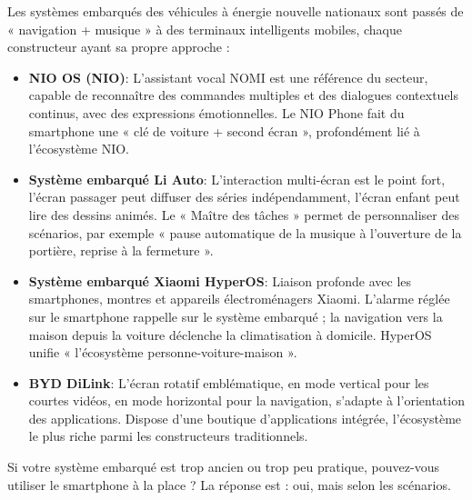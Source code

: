 
Les systèmes embarqués des véhicules à énergie nouvelle nationaux sont passés de « navigation + musique » à des terminaux intelligents mobiles, chaque constructeur ayant sa propre approche :

\begin{itemize}
  \item \textbf{NIO OS (NIO)}: L'assistant vocal NOMI est une référence du secteur, capable de reconnaître des commandes multiples et des dialogues contextuels continus, avec des expressions émotionnelles. Le NIO Phone fait du smartphone une « clé de voiture + second écran », profondément lié à l'écosystème NIO.
  \item \textbf{Système embarqué Li Auto}: L'interaction multi-écran est le point fort, l'écran passager peut diffuser des séries indépendamment, l'écran enfant peut lire des dessins animés. Le « Maître des tâches » permet de personnaliser des scénarios, par exemple « pause automatique de la musique à l'ouverture de la portière, reprise à la fermeture ».
  \item \textbf{Système embarqué Xiaomi HyperOS}: Liaison profonde avec les smartphones, montres et appareils électroménagers Xiaomi. L'alarme réglée sur le smartphone rappelle sur le système embarqué ; la navigation vers la maison depuis la voiture déclenche la climatisation à domicile. HyperOS unifie « l'écosystème personne-voiture-maison ».
  \item \textbf{BYD DiLink}: L'écran rotatif emblématique, en mode vertical pour les courtes vidéos, en mode horizontal pour la navigation, s'adapte à l'orientation des applications. Dispose d'une boutique d'applications intégrée, l'écosystème le plus riche parmi les constructeurs traditionnels.
\end{itemize}


Si votre système embarqué est trop ancien ou trop peu pratique, pouvez-vous utiliser le smartphone à la place ? La réponse est : oui, mais selon les scénarios.

